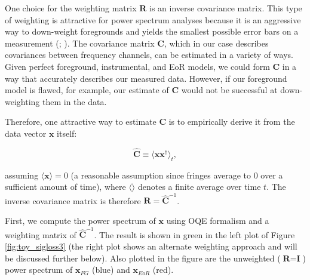 \documentclass[preprint2,numberedappendix,tighten]{aastex6}  %
\begin{document}
One choice for the weighting matrix $\textbf{R}$ is an inverse covariance matrix. This type of weighting is attractive for power 
spectrum analyses because it is an aggressive way to down-weight foregrounds and yields the smallest possible error bars on 
a measurement (\citealt{tegmark_et_al1997a}; \citealt{bond_et_al1998}). The covariance matrix $\textbf{C}$, which in our case 
describes covariances between frequency channels, can be estimated in a variety of ways. Given perfect foreground, 
instrumental, and EoR models, we could form $\textbf{C}$ in a way that accurately describes our measured data. However, if 
our foreground model is flawed, for example, our estimate of $\textbf{C}$ would not be successful at down-weighting them in 
the data. 

Therefore, one attractive way to estimate $\textbf{C}$ is to empirically derive it from the data vector $\textbf{x}$ itself:

\begin{equation}
\hat{\textbf{C}} \equiv \langle\textbf{xx}^{\dagger}\rangle_{t},
\end{equation}

\noindent assuming $\langle\textbf{x}\rangle = 0$ (a reasonable assumption since fringes average to $0$ over a sufficient 
amount of time), where $\langle \rangle$ denotes a finite average over time $t$. The inverse covariance matrix is therefore $
\textbf{R} = \hat{\textbf{C}}^{-1}$. 

First, we compute the power spectrum of $\textbf{x}$ using OQE formalism and a weighting matrix of $\hat{\textbf{C}}^{-1}$. 
The result is shown in green in the left plot of Figure \ref{fig:toy_sigloss3} (the right plot shows an alternate weighting approach 
and will be discussed further below). Also plotted in the figure are the unweighted ($\textbf{R} = \textbf{I}$) power spectrum of $
\textbf{x}_{FG}$ (blue) and $\textbf{x}_{EoR}$ (red). 
\end{document}
